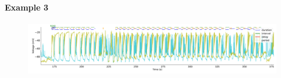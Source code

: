 \paragraph{\large{Example 3}}


\begin{figure}[htbp]
	\centering
	\begin{minipage}[b]{\textwidth}
		\centering
		\includegraphics[width=\textwidth]{./invariants/data/SUSSEX/CV1a_driven3/images/stim_cv1a3_signal_intervals_zoom.pdf}
	\end{minipage}
	\centering
	\begin{minipage}[b]{0.43\textwidth}
		\centering

\end{minipage}
\end{figure}
